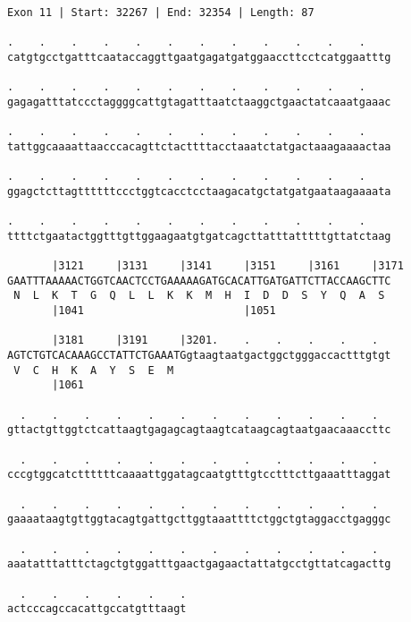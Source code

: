 \documentclass{article}
\begin{document}
\begin{Verbatim}[fontfamily=courier]
Exon 11 | Start: 32267 | End: 32354 | Length: 87

.    .    .    .    .    .    .    .    .    .    .    .    
catgtgcctgatttcaataccaggttgaatgagatgatggaaccttcctcatggaatttg

.    .    .    .    .    .    .    .    .    .    .    .    
gagagatttatccctaggggcattgtagatttaatctaaggctgaactatcaaatgaaac

.    .    .    .    .    .    .    .    .    .    .    .    
tattggcaaaattaacccacagttctacttttacctaaatctatgactaaagaaaactaa

.    .    .    .    .    .    .    .    .    .    .    .    
ggagctcttagttttttccctggtcacctcctaagacatgctatgatgaataagaaaata

.    .    .    .    .    .    .    .    .    .    .    .    
ttttctgaatactggtttgttggaagaatgtgatcagcttatttatttttgttatctaag

       |3121     |3131     |3141     |3151     |3161     |3171
GAATTTAAAAACTGGTCAACTCCTGAAAAAGATGCACATTGATGATTCTTACCAAGCTTC
 N  L  K  T  G  Q  L  L  K  K  M  H  I  D  D  S  Y  Q  A  S 
       |1041                         |1051                  

       |3181     |3191     |3201.    .    .    .    .    .  
AGTCTGTCACAAAGCCTATTCTGAAATGgtaagtaatgactggctgggaccactttgtgt
 V  C  H  K  A  Y  S  E  M                                  
       |1061                                                

  .    .    .    .    .    .    .    .    .    .    .    .  
gttactgttggtctcattaagtgagagcagtaagtcataagcagtaatgaacaaaccttc

  .    .    .    .    .    .    .    .    .    .    .    .  
cccgtggcatcttttttcaaaattggatagcaatgtttgtcctttcttgaaatttaggat

  .    .    .    .    .    .    .    .    .    .    .    .  
gaaaataagtgttggtacagtgattgcttggtaaattttctggctgtaggacctgagggc

  .    .    .    .    .    .    .    .    .    .    .    .  
aaatatttatttctagctgtggatttgaactgagaactattatgcctgttatcagacttg

  .    .    .    .    .    .
actcccagccacattgccatgtttaagt
\end{Verbatim}
\newpage
\end{document}
